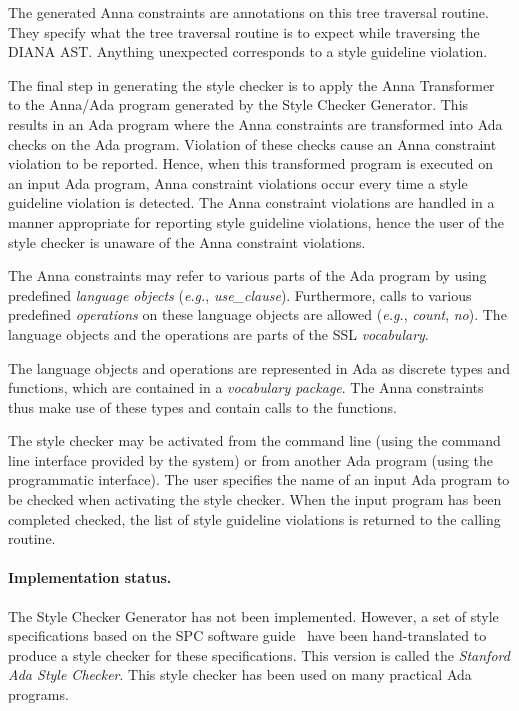 The generated Anna constraints are annotations on this tree traversal
routine.  They specify what the tree traversal routine is to expect
while traversing the DIANA AST.  Anything unexpected corresponds to a
style guideline violation.

The final step in generating the style checker is to apply the Anna
Transformer~\cite{sankar:thesis} to the Anna/Ada program generated by
the Style Checker Generator.  This results in an Ada program where the
Anna constraints are transformed into Ada checks on the Ada program.
Violation of these checks cause an Anna constraint violation to be
reported.  Hence, when this transformed program is executed on an
input Ada program, Anna constraint violations occur every time a
style guideline violation is detected.  The Anna constraint violations
are handled in a manner appropriate for reporting style guideline
violations, hence the user of the style checker is unaware of the
Anna constraint violations.

The Anna constraints may refer to various parts of the Ada program by
using predefined {\em language objects} ({\em e.g.}, {\it use\_clause}).
Furthermore, calls to various predefined {\em operations} on these
language objects are allowed ({\em e.g.}, {\it count}, {\it no}). The
language objects and the operations are parts of the SSL {\em
vocabulary}.

The language objects and operations are represented in Ada as discrete
types and functions, which are contained in a {\em vocabulary
package}.  The Anna constraints thus make use of these types and
contain calls to the functions.

The style checker may be activated from the command line (using the
command line interface provided by the system) or from another Ada
program (using the programmatic interface). The user specifies the
name of an input Ada program to be checked when activating the style
checker.  When the input program has been completed checked, the list
of style guideline violations is returned to the calling routine.

\paragraph{Implementation status.}
The Style Checker Generator has not been implemented.  However, a
set of style specifications based on the SPC software
guide~\cite{SPC88} have been hand-translated to produce a style
checker for these specifications.  This version is called the
{\em Stanford Ada Style Checker}.  This style checker has been used
on many practical Ada programs.

